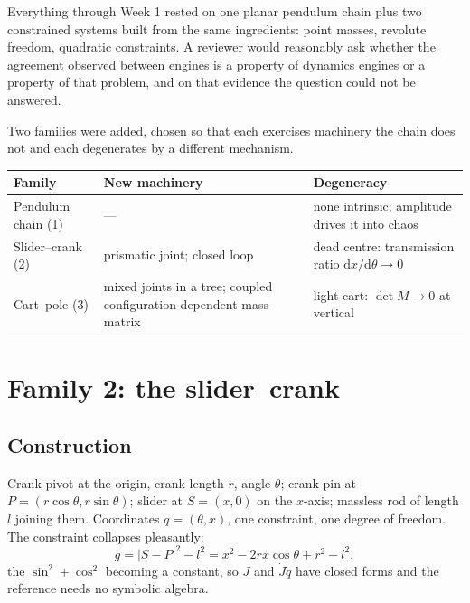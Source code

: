 \documentclass[11pt,a4paper]{article}
\begin{document}
Everything through Week 1 rested on one planar pendulum chain plus two
constrained systems built from the same ingredients: point masses, revolute
freedom, quadratic constraints. A reviewer would reasonably ask whether the
agreement observed between engines is a property of dynamics engines or a
property of that problem, and on that evidence the question could not be
answered.

Two families were added, chosen so that each exercises machinery the chain does
not and each degenerates by a different mechanism.

\begin{center}
\begin{tabular}{@{}lL{0.28\textwidth}L{0.32\textwidth}@{}}
\toprule
\textbf{Family} & \textbf{New machinery} & \textbf{Degeneracy} \\
\midrule
Pendulum chain (1) & --- & none intrinsic; amplitude drives it into chaos \\
Slider--crank (2)  & prismatic joint; closed loop & dead centre: transmission ratio $\mathrm{d}x/\mathrm{d}\theta \to 0$ \\
Cart--pole (3)     & mixed joints in a tree; coupled configuration-dependent mass matrix & light cart: $\det M \to 0$ at vertical \\
\bottomrule
\end{tabular}
\end{center}

\section{Family 2: the slider--crank}

\subsection{Construction}

Crank pivot at the origin, crank length $r$, angle $\theta$; crank pin at
$P = (r\cos\theta, r\sin\theta)$; slider at $S = (x, 0)$ on the $x$-axis;
massless rod of length $l$ joining them. Coordinates $q = (\theta, x)$, one
constraint, one degree of freedom. The constraint collapses pleasantly:
\begin{equation}
g = |S-P|^2 - l^2 = x^2 - 2rx\cos\theta + r^2 - l^2,
\end{equation}
the $\sin^2+\cos^2$ becoming a constant, so $J$ and $\dot J\dot q$ have closed
forms and the reference needs no symbolic algebra.
\end{document}
